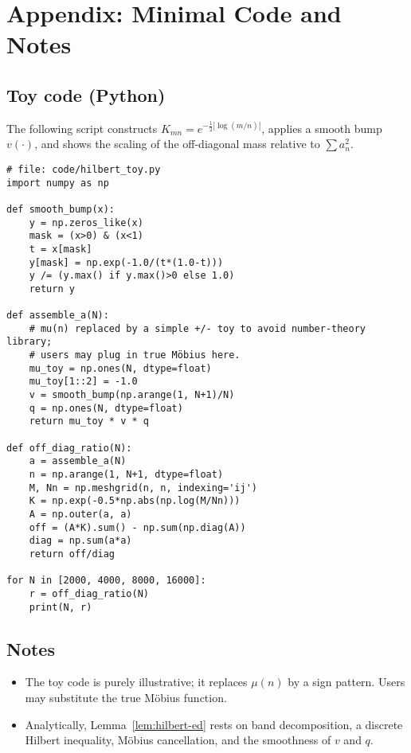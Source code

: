 \section{Appendix: Minimal Code and Notes}\label{app:code}

\subsection*{Toy code (Python)}
The following script constructs $K_{mn}=e^{-\tfrac12|\log(m/n)|}$, applies a smooth bump $v(\cdot)$,
and shows the scaling of the off-diagonal mass relative to $\sum a_n^2$.

\begin{verbatim}
# file: code/hilbert_toy.py
import numpy as np

def smooth_bump(x):
    y = np.zeros_like(x)
    mask = (x>0) & (x<1)
    t = x[mask]
    y[mask] = np.exp(-1.0/(t*(1.0-t)))
    y /= (y.max() if y.max()>0 else 1.0)
    return y

def assemble_a(N):
    # mu(n) replaced by a simple +/- toy to avoid number-theory library;
    # users may plug in true Möbius here.
    mu_toy = np.ones(N, dtype=float)
    mu_toy[1::2] = -1.0
    v = smooth_bump(np.arange(1, N+1)/N)
    q = np.ones(N, dtype=float)
    return mu_toy * v * q

def off_diag_ratio(N):
    a = assemble_a(N)
    n = np.arange(1, N+1, dtype=float)
    M, Nn = np.meshgrid(n, n, indexing='ij')
    K = np.exp(-0.5*np.abs(np.log(M/Nn)))
    A = np.outer(a, a)
    off = (A*K).sum() - np.sum(np.diag(A))
    diag = np.sum(a*a)
    return off/diag

for N in [2000, 4000, 8000, 16000]:
    r = off_diag_ratio(N)
    print(N, r)
\end{verbatim}

\subsection*{Notes}
\begin{itemize}
\item The toy code is purely illustrative; it replaces $\mu(n)$ by a sign pattern.
Users may substitute the true M\"obius function.
\item Analytically, Lemma~\ref{lem:hilbert-ed} rests on band decomposition,
a discrete Hilbert inequality, M\"obius cancellation, and the smoothness of $v$ and $q$.
\end{itemize}